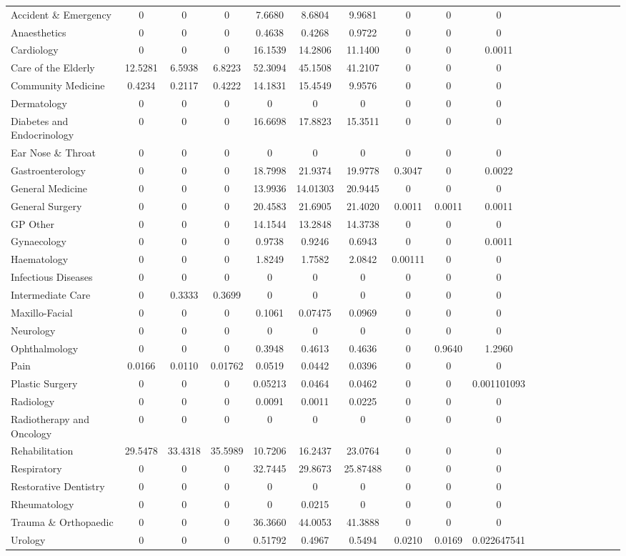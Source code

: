 \documentclass[thesis.tex]{subfiles}
\begin{document}
\begin{landscape}
\begin{table}[h!]
{\begin{tabular}{lcccccccccccccccccc}
Accident \& Emergency&	0	&0	&0	&7.6680	&8.6804&	9.9681&	0	&0	&0\\
Anaesthetics	&0&	0	&0&	0.4638&	0.4268&	0.9722&	0	&0	&0\\
Cardiology&	0&	0	&0	&16.1539&	14.2806	&11.1400	&0&	0&	0.0011\\
Care of the Elderly	&12.5281&	6.5938	&6.8223	&52.3094	&45.1508	&41.2107&	0&	0	&0\\
Community Medicine&	0.4234&	0.2117&	0.4222&14.1831	&15.4549	&9.9576&	0&	0	&0\\
Dermatology&	0	&0	&0&	0&	0	&0&	0&	0	&0\\
Diabetes and Endocrinology&	0	&0	&0	&16.6698	&17.8823	&15.3511&	0	&0&	0\\
Ear Nose \& Throat	&0	&0	&0	&0&	0	&0&	0&	0&	0\\
Gastroenterology	&0	&0	&0&	18.7998	&21.9374	&19.9778	&0.3047&	0&	0.0022\\
General Medicine	&0	&0	&0	&13.9936	&14.01303	&20.9445	&0&	0	&0\\
General Surgery&	0	&0&	0	&20.4583 &21.6905&	21.4020&	0.0011&0.0011&	0.0011\\
GP Other	&0	&0&	0&	14.1544	&13.2848	&14.3738&	0	&0	&0\\
Gynaecology	&0	&0&	0&	0.9738	&0.9246	&0.6943	&0	&0	&0.0011\\
Haematology&	0	&0&	0&	1.8249&	1.7582&	2.0842&	0.00111	&0	&0\\
Infectious Diseases	&0	&0	&0	&0	&0&	0&	0	&0&	0\\
Intermediate Care&	0	&0.3333	&0.3699&	0&	0	&0	&0	&0&	0\\
Maxillo-Facial&	0	&0	&0	&0.1061&	0.07475	&0.0969	&0	&0 &	0\\
Neurology&	0	&0	&0	&0	&0&	0	&0	&0	&0\\
Ophthalmology&	0&	0	&0	&0.3948&	0.4613	&0.4636&0	&0.9640	&1.2960\\
Pain	&0.0166	&0.0110&	0.01762&	0.0519&0.0442&	0.0396	&0&	0&	0\\
Plastic Surgery	&0	&0&	0	&0.05213&	0.0464	&0.0462&	0	&0	&0.001101093\\
Radiology&0&0&	0&	0.0091&	0.0011	&0.0225	&0&	0&	0\\
Radiotherapy and Oncology	&0&	0&	0	&0	&0&	0	&0	&0&	0\\
Rehabilitation	&29.5478	&33.4318	&35.5989&	10.7206&16.2437&	23.0764	&0&	0&	0\\
Respiratory	&0&	0&	0	&32.7445	&29.8673	&25.87488&	0&	0&	0\\
Restorative Dentistry	&0&	0	&0	&0&0	&0	&0	&0&	0\\
Rheumatology	&0	&0	&0&	0&	0.0215&	0&	0&	0	&0\\
Trauma \& Orthopaedic	&0&	0&	0&	36.3660	&44.0053&	41.3888&	0&	0&	0\\
Urology	&0	&0&0	&0.51792&	0.4967&	0.5494&	0.0210	&0.0169	&0.022647541\\\bottomrule



\end{tabular}}
\end{table}
\end{landscape}
\end{document}
